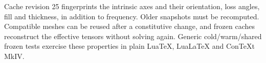 Cache revision 25 fingerprints the intrinsic axes and their orientation, loss angles, fill and
thickness, in addition to frequency. Older snapshots must be recomputed.
Compatible meshes can be reused after a constitutive change, and frozen caches
reconstruct the effective tensors without solving again. Generic cold/warm/shared
frozen tests exercise these properties in plain LuaTeX, LuaLaTeX and ConTeXt MkIV.
